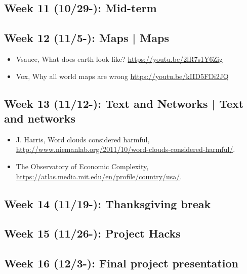 \documentclass[11pt,article,oneside]{memoir} %
\begin{document}
\subsection{Week 11 (10/29-): Mid-term}
\subsection{Week 12 (11/5-): Maps | Maps }

\begin{itemize}\itemsep0em 
\item Vsauce, What does earth look like? \url{https://youtu.be/2lR7s1Y6Zig}
\item Vox, Why all world maps are wrong \url{https://youtu.be/kIID5FDi2JQ}
\end{itemize}	

\subsection{Week 13 (11/12-): Text and Networks | Text and networks} 

\begin{itemize}\itemsep0em 
\item J. Harris, Word clouds considered harmful, \url{http://www.niemanlab.org/2011/10/word-clouds-considered-harmful/}. 
\item The Observatory of Economic Complexity, \url{https://atlas.media.mit.edu/en/profile/country/usa/}.
\end{itemize}	

\subsection{Week 14 (11/19-): Thanksgiving break}

\subsection{Week 15 (11/26-): Project Hacks}

\subsection{Week 16 (12/3-): Final project presentation}
\end{document}
